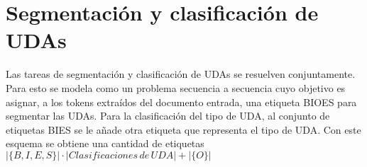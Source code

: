\documentclass[a4paper,11pt,twocolumn,twoside]{article}
\begin{document}


\section{Segmentación y clasificación de UDAs}


Las tareas de segmentación y clasificación de UDAs se resuelven conjuntamente. Para esto se modela 
como un problema secuencia a secuencia cuyo objetivo es asignar, a los tokens extraídos del documento 
entrada, una etiqueta BIOES para segmentar las UDAs. Para la clasificación del tipo 
de UDA, al conjunto de etiquetas BIES se le añade otra etiqueta que representa el tipo de UDA. Con 
este esquema se obtiene una cantidad de etiquetas $|\{B,I,E,S\}| \cdot |Clasificaciones \, de \, UDA| + |\{O\}|$
\end{document}
